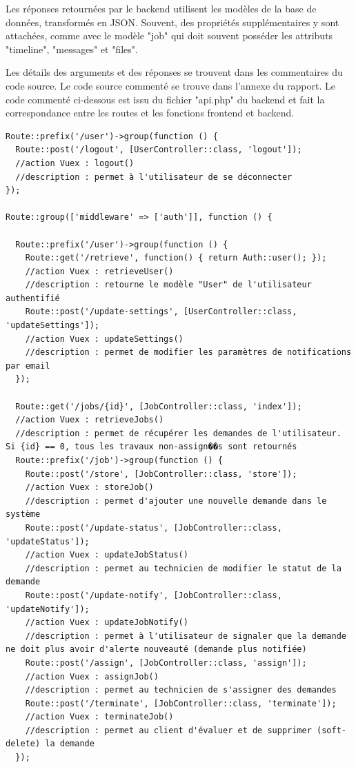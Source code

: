 \documentclass[
    iai, %
    eai, %
]{heig-tb}
\begin{document}
Les réponses retournées par le backend utilisent les modèles de la base de données, transformés en JSON. Souvent, des propriétés supplémentaires y sont attachées, comme avec le modèle "job" qui doit souvent posséder les attributs "timeline", "messages" et "files".

Les détails des arguments et des réponses se trouvent dans les commentaires du code source. Le code source commenté se trouve dans l'annexe du rapport. Le code commenté ci-dessous est issu du fichier "api.php" du backend et fait la correspondance entre les routes et les fonctions frontend et backend.

\newpage
\begin{verbatim}
Route::prefix('/user')->group(function () {
  Route::post('/logout', [UserController::class, 'logout']);
  //action Vuex : logout()
  //description : permet à l'utilisateur de se déconnecter
});

Route::group(['middleware' => ['auth']], function () {

  Route::prefix('/user')->group(function () {
    Route::get('/retrieve', function() { return Auth::user(); });
    //action Vuex : retrieveUser()
    //description : retourne le modèle "User" de l'utilisateur authentifié
    Route::post('/update-settings', [UserController::class, 'updateSettings']);
    //action Vuex : updateSettings()
    //description : permet de modifier les paramètres de notifications par email
  });

  Route::get('/jobs/{id}', [JobController::class, 'index']);
  //action Vuex : retrieveJobs()
  //description : permet de récupérer les demandes de l'utilisateur. Si {id} == 0, tous les travaux non-assign��s sont retournés
  Route::prefix('/job')->group(function () {
    Route::post('/store', [JobController::class, 'store']);
    //action Vuex : storeJob()
    //description : permet d'ajouter une nouvelle demande dans le système
    Route::post('/update-status', [JobController::class, 'updateStatus']);
    //action Vuex : updateJobStatus()
    //description : permet au technicien de modifier le statut de la demande
    Route::post('/update-notify', [JobController::class, 'updateNotify']);
    //action Vuex : updateJobNotify()
    //description : permet à l'utilisateur de signaler que la demande ne doit plus avoir d'alerte nouveauté (demande plus notifiée)
    Route::post('/assign', [JobController::class, 'assign']);
    //action Vuex : assignJob()
    //description : permet au technicien de s'assigner des demandes
    Route::post('/terminate', [JobController::class, 'terminate']);
    //action Vuex : terminateJob()
    //description : permet au client d'évaluer et de supprimer (soft-delete) la demande
  });


\end{verbatim}
\end{document}
